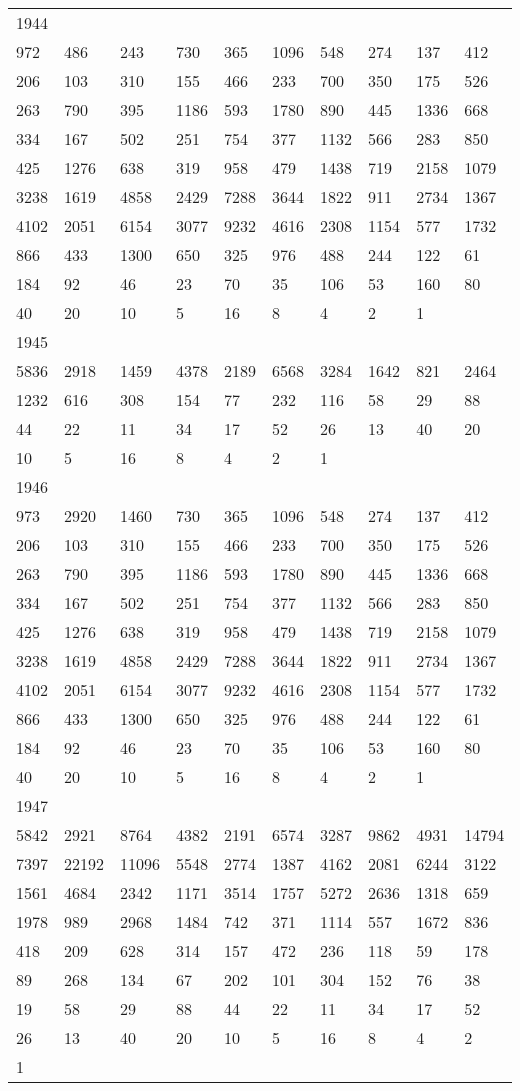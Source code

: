 \begin{longtable}{*{10}{l}}
1944&&&&&&&&&\\
972& 486& 243& 730& 365& 1096& 548& 274& 137& 412\\
206& 103& 310& 155& 466& 233& 700& 350& 175& 526\\
263& 790& 395& 1186& 593& 1780& 890& 445& 1336& 668\\
334& 167& 502& 251& 754& 377& 1132& 566& 283& 850\\
425& 1276& 638& 319& 958& 479& 1438& 719& 2158& 1079\\
3238& 1619& 4858& 2429& 7288& 3644& 1822& 911& 2734& 1367\\
4102& 2051& 6154& 3077& 9232& 4616& 2308& 1154& 577& 1732\\
866& 433& 1300& 650& 325& 976& 488& 244& 122& 61\\
184& 92& 46& 23& 70& 35& 106& 53& 160& 80\\
40& 20& 10& 5& 16& 8& 4& 2& 1& \\

1945&&&&&&&&&\\
5836& 2918& 1459& 4378& 2189& 6568& 3284& 1642& 821& 2464\\
1232& 616& 308& 154& 77& 232& 116& 58& 29& 88\\
44& 22& 11& 34& 17& 52& 26& 13& 40& 20\\
10& 5& 16& 8& 4& 2& 1& \\

1946&&&&&&&&&\\
973& 2920& 1460& 730& 365& 1096& 548& 274& 137& 412\\
206& 103& 310& 155& 466& 233& 700& 350& 175& 526\\
263& 790& 395& 1186& 593& 1780& 890& 445& 1336& 668\\
334& 167& 502& 251& 754& 377& 1132& 566& 283& 850\\
425& 1276& 638& 319& 958& 479& 1438& 719& 2158& 1079\\
3238& 1619& 4858& 2429& 7288& 3644& 1822& 911& 2734& 1367\\
4102& 2051& 6154& 3077& 9232& 4616& 2308& 1154& 577& 1732\\
866& 433& 1300& 650& 325& 976& 488& 244& 122& 61\\
184& 92& 46& 23& 70& 35& 106& 53& 160& 80\\
40& 20& 10& 5& 16& 8& 4& 2& 1& \\

1947&&&&&&&&&\\
5842& 2921& 8764& 4382& 2191& 6574& 3287& 9862& 4931& 14794\\
7397& 22192& 11096& 5548& 2774& 1387& 4162& 2081& 6244& 3122\\
1561& 4684& 2342& 1171& 3514& 1757& 5272& 2636& 1318& 659\\
1978& 989& 2968& 1484& 742& 371& 1114& 557& 1672& 836\\
418& 209& 628& 314& 157& 472& 236& 118& 59& 178\\
89& 268& 134& 67& 202& 101& 304& 152& 76& 38\\
19& 58& 29& 88& 44& 22& 11& 34& 17& 52\\
26& 13& 40& 20& 10& 5& 16& 8& 4& 2\\
1& \\


\end{longtable}
